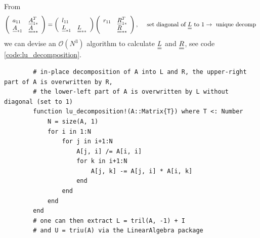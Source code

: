 


From
\begin{equation}
    \left(\begin{array}{ll}
    a_{11} & \vec{A}^T_{1 *} \\
    \vec{A}_{* 1} & \mat{A}_{* *}
    \end{array}\right)=\left(\begin{array}{ll}
    l_{11} & \\
    \vec{L}_{* 1} & \mat{L}_{* *}
    \end{array}\right)\left(\begin{array}{ll}
    r_{11} & \vec{R}^T_{1 *} \\
    & \mat{R}_{* *}
    \end{array}\right), \quad \text { set diagonal of } \mat{L} \text { to } 1 \rightarrow \text { unique decomp }
\end{equation}
we can devise an $\mathcal{O}(N^3)$ algorithm to calculate $\mat{L}$ and $\mat{R}$,
see code \ref{code:lu_decomposition}.

\begin{codebox}[!htb]
    \begin{verbatim}
        # in-place decomposition of A into L and R, the upper-right part of A is overwritten by R,
        # the lower-left part of A is overwritten by L without diagonal (set to 1)
        function lu_decomposition!(A::Matrix{T}) where T <: Number
            N = size(A, 1)
            for i in 1:N
                for j in i+1:N
                    A[j, i] /= A[i, i]
                    for k in i+1:N
                        A[j, k] -= A[j, i] * A[i, k]
                    end
                end
            end
        end
        # one can then extract L = tril(A, -1) + I
        # and U = triu(A) via the LinearAlgebra package
    \end{verbatim}
    \caption{LU-decomposition of a matrix $\mat{A} \in \mathbb{R}^{N\times N}$ in $\mathcal{O}(N^3)$.}
    \label{code:lu_decomposition}
\end{codebox}

